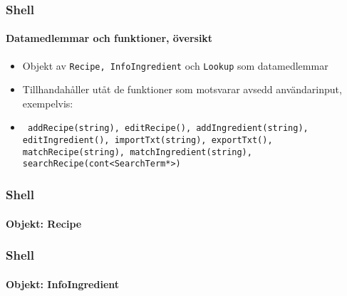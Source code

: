 %
%

\begin{frame}
  \frametitle{Shell}
  \framesubtitle{Datamedlemmar och funktioner, översikt}
  \begin{itemize}
    \item Objekt av \texttt{Recipe, InfoIngredient} och \texttt{Lookup} som datamedlemmar
    \item<2-> Tillhandahåller utåt de funktioner som motsvarar avsedd användarinput, exempelvis:
    \item<2-> \texttt{
      addRecipe(string), editRecipe(),
      addIngredient(string), editIngredient(),
      importTxt(string), exportTxt(),
      matchRecipe(string), matchIngredient(string),
      searchRecipe(cont<SearchTerm*>)
    }
  \end{itemize} 
\end{frame}

\begin{frame}
  \frametitle{Shell}
  \framesubtitle{Objekt: Recipe}
\end{frame}

\begin{frame}
  \frametitle{Shell}
  \framesubtitle{Objekt: InfoIngredient} 
\end{frame}

